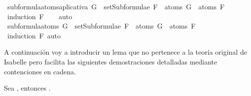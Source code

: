 \begin{isabellebody}
\ subformula{\isacharunderscore}atoms{\isacharunderscore}aplicativa{\isacharcolon}\ {\isachardoublequoteopen}G\ {\isasymin}\ setSubformulae\ F\ {\isasymLongrightarrow}\ atoms\ G\ {\isasymsubseteq}\ atoms\ F{\isachardoublequoteclose}\isanewline
%
\isadelimproof
\ \ %
\endisadelimproof
%
\isatagproof
{}\isamarkupfalse%
\ {\isacharparenleft}induction\ F{\isacharparenright}\isanewline
\ \ \isamarkupfalse%
\ auto\isanewline
\ \isamarkupfalse%
%
\endisatagproof
{\isafoldproof}%
%
\isadelimproof
\isanewline
%
\endisadelimproof
\isanewline
{}\isamarkupfalse%
\ subformula{\isacharunderscore}atoms{\isacharcolon}\ {\isachardoublequoteopen}G\ {\isasymin}\ setSubformulae\ F\ {\isasymLongrightarrow}\ atoms\ G\ {\isasymsubseteq}\ atoms\ F{\isachardoublequoteclose}\isanewline
%
\isadelimproof
\ \ %
\endisadelimproof
%
\isatagproof
{}\isamarkupfalse%
\ {\isacharparenleft}induction\ F{\isacharparenright}\ auto%
\endisatagproof
{\isafoldproof}%
%
\isadelimproof
%
\endisadelimproof
%
\begin{isamarkuptext}%
A continuación voy a introducir un lema que no pertenece a la teoría original de Isabelle pero
facilita las siguientes demostraciones detalladas mediante contenciones en cadena.

\begin{lema}
    Sea , entonces .
  \end{lema} 


\end{isamarkuptext}
\end{isabellebody}
